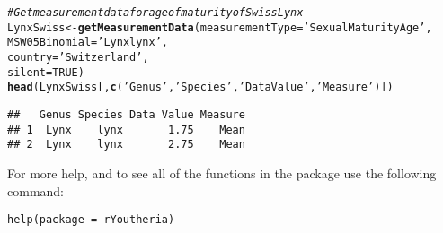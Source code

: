 \documentclass[a4paper]{article}\usepackage[]{graphicx}\usepackage[]{color}
\makeatletter
\newcommand{\hlnum}[1]{\textcolor[rgb]{0.686,0.059,0.569}{#1}}%
\newcommand{\hlstr}[1]{\textcolor[rgb]{0.192,0.494,0.8}{#1}}%
\newcommand{\hlcom}[1]{\textcolor[rgb]{0.678,0.584,0.686}{\textit{#1}}}%
\newcommand{\hlstd}[1]{\textcolor[rgb]{0.345,0.345,0.345}{#1}}%
\newcommand{\hlkwb}[1]{\textcolor[rgb]{0.69,0.353,0.396}{#1}}%
\newcommand{\hlkwc}[1]{\textcolor[rgb]{0.333,0.667,0.333}{#1}}%
\newcommand{\hlkwd}[1]{\textcolor[rgb]{0.737,0.353,0.396}{\textbf{#1}}}%
\newenvironment{kframe}{%
 \def\at@end@of@kframe{}%
 \ifinner\ifhmode%
  \def\at@end@of@kframe{\end{minipage}}%
  \begin{minipage}{\columnwidth}%
 \fi\fi%
 \def\FrameCommand##1{\hskip\@totalleftmargin \hskip-\fboxsep
 \colorbox{shadecolor}{##1}\hskip-\fboxsep
     \hskip-\linewidth \hskip-\@totalleftmargin \hskip\columnwidth}%
 \MakeFramed {\advance\hsize-\width
   \@totalleftmargin\z@ \linewidth\hsize
   \@setminipage}}%
 {\par\unskip\endMakeFramed%
 \at@end@of@kframe}
\newenvironment{knitrout}{}{} %
\makeatother
\begin{document}
\begin{knitrout}
\begin{kframe}
\begin{verbatim}
\end{verbatim}
\begin{alltt}
\hlcom{# Get measurement data for age of maturity of Swiss Lynx}
\hlstd{LynxSwiss} \hlkwb{<-} \hlkwd{getMeasurementData}\hlstd{(}\hlkwc{measurementType} \hlstd{=} \hlstr{'Sexual Maturity Age'}\hlstd{,}
                                \hlkwc{MSW05Binomial} \hlstd{=} \hlstr{'Lynx lynx'}\hlstd{,}
                                \hlkwc{country} \hlstd{=} \hlstr{'Switzerland'}\hlstd{,}
                                \hlkwc{silent} \hlstd{=} \hlnum{TRUE}\hlstd{)}
\hlkwd{head}\hlstd{(LynxSwiss[,}\hlkwd{c}\hlstd{(}\hlstr{'Genus'}\hlstd{,}\hlstr{'Species'}\hlstd{,}\hlstr{'Data Value'}\hlstd{,}\hlstr{'Measure'}\hlstd{)])}
\end{alltt}
\begin{verbatim}
##   Genus Species Data Value Measure
## 1  Lynx    lynx       1.75    Mean
## 2  Lynx    lynx       2.75    Mean
\end{verbatim}
\end{kframe}
\end{knitrout}

For more help, and to see all of the functions in the package use the following command:

\begin{verbatim}
help(package = rYoutheria)
\end{verbatim}
\end{document}

